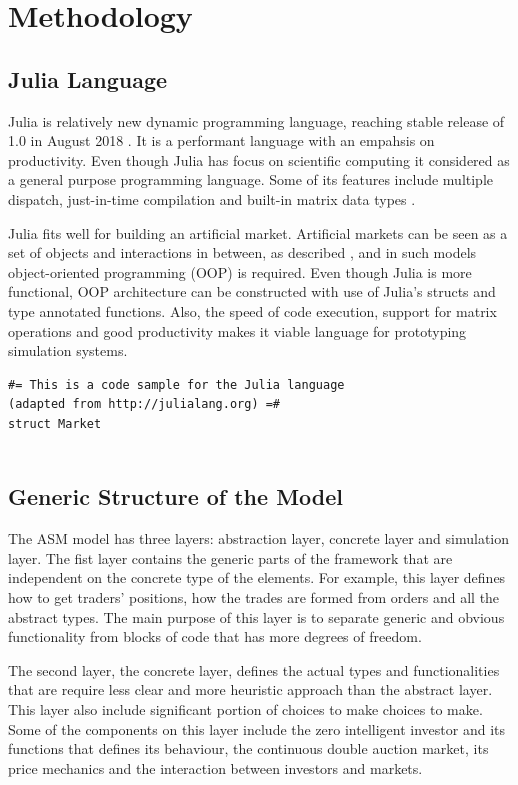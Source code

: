 
\section{Methodology}

\subsection{Julia Language}
Julia is relatively new dynamic programming language, 
reaching stable release of 1.0 in August 2018 \citep{JuliaV1}.
It is a performant language with an empahsis
on productivity. Even though Julia has focus on scientific 
computing it considered as a general purpose programming
language. Some of its features include
multiple dispatch, just-in-time compilation and built-in
matrix data types \citep{Julia}.

Julia fits well for building an artificial market.
Artificial markets can be seen as a set of objects
and interactions in between, as described \citet{Ben12},
and in such models object-oriented programming (OOP)
is required. Even though Julia is more functional, OOP
architecture can be constructed with use of Julia's 
structs and type annotated functions. Also, the 
speed of code execution, support for matrix operations 
and good productivity makes it viable language for 
prototyping simulation systems. 


\begin{lstlisting}
#= This is a code sample for the Julia language
(adapted from http://julialang.org) =#
struct Market
    
\end{lstlisting}


\subsection{Generic Structure of the Model}
The ASM model has three layers: abstraction layer, concrete 
layer and simulation layer. The fist layer contains the 
generic parts of the framework that are independent on the concrete
type of the elements. For example, this layer defines how 
to get traders' positions, how the trades are formed from
orders and all the abstract types. The main purpose of this layer
is to separate generic and obvious functionality from blocks of code
that has more degrees of freedom.

The second layer, the concrete layer, defines the actual types and
functionalities that are require less clear and more heuristic
approach than the abstract layer. This layer also include significant
portion of choices to make choices to make. Some of the components
on this layer include the zero intelligent investor and its
functions that defines its behaviour, the continuous double auction
market, its price mechanics and the interaction between investors
and markets.

